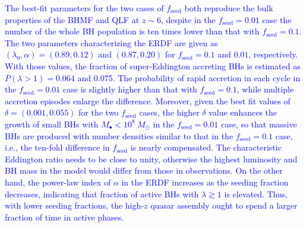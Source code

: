 \documentclass[twocolumn, twocolappendix]{aastex63}
\newcommand{\Msun}{M_\odot}
\newcommand{\fseed}{f_\mathrm{seed}}
\newcommand{\blue}[1]{\textcolor{blue}{ #1}}
\begin{document}
\begin{CJK*}{UTF8}{gbsn}
\blue{
The best-fit parameters for the two cases of $\fseed$ both reproduce the bulk properties of the BHMF and QLF at $z\sim 6$,
despite in the $\fseed=0.01$ case the number of the whole BH population is ten times lower than that with $\fseed=0.1$.
The two parameters characterizing the ERDF are given as
$(\lambda_0,\alpha) = (0.89,0.12)$ and $(0.87,0.20)$ for $\fseed=0.1$ and $0.01$, respectively.
With those values, the fraction of super-Eddington accreting BHs is estimated as $P(\lambda>1)=0.064$ and 0.075. 
The probability of rapid accretion in each cycle in the $\fseed=0.01$ case is slightly higher than that with $\fseed=0.1$,
while multiple accretion episodes enlarge the difference.
Moreover, given the best fit values of $\delta=(0.001,0.055)$ for the two $\fseed$ cases,
the higher $\delta$ value enhances the growth of small BHs with $M_\bullet <10^8~\Msun$ in the $\fseed=0.01$ case,
so that massive BHs are produced with number densities similar to that in the $\fseed=0.1$ case,
i.e., the ten-fold difference in $\fseed$ is nearly compensated.
The characteristic Eddington ratio needs to be close to unity, otherwise the highest luminosity and BH mass
in the model would differ from those in observations.
On the other hand, the power-law index of $\alpha$ in the ERDF increases as the seeding fraction decreases,
indicating that fraction of active BHs with $\lambda \gtrsim 1$ is elevated. 
Thus, with lower seeding fractions, the high-$z$ quasar assembly ought to spend a larger fraction of time in active phases.
}


\end{CJK*}
\end{document}
